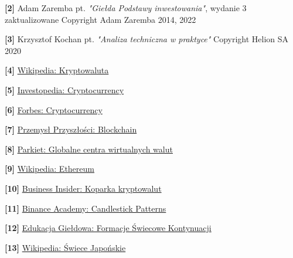 \documentclass[12pt,a4paper,twoside, inzynierska]{pwr_wmat_praca_dyplomowa}
\theoremstyle{plain}
\numberwithin{theorem}{chapter}
\theoremstyle{definition}
\numberwithin{theorem}{chapter}
\begin{document}
\noindent \textbf{[2]} Adam Zaremba pt. \textit{"Giełda Podstawy inwestowania"}, wydanie 3 zaktualizowane Copyright \textcopyright{} Adam Zaremba 2014, 2022 \newline

\noindent \textbf{[3]} Krzysztof Kochan pt. \textit{"Analiza techniczna w praktyce"} Copyright \textcopyright{} Helion SA 2020 \newline

\noindent \textbf{[4]} \href{https://pl.wikipedia.org/wiki/Kryptowaluta}{Wikipedia: Kryptowaluta} \newline

\noindent \textbf{[5]} \href{https://www.investopedia.com/terms/c/cryptocurrency.asp}{Investopedia: Cryptocurrency} \newline

\noindent \textbf{[6]} \href{https://www.forbes.com/advisor/investing/cryptocurrency/}{Forbes: Cryptocurrency} \newline

\noindent \textbf{[7]} \href{https://przemyslprzyszlosci.gov.pl/nawigator-technologiczny/blockchain/}{Przemysł Przyszłości: Blockchain} \newline

\noindent \textbf{[8]} \href{https://www.parkiet.com/kryptowaluty/art40380371-gdzie-sa-globalne-centra-wiary-w-wirtualne-waluty}{Parkiet: Globalne centra wirtualnych walut} \newline

\noindent \textbf{[9]} \href{https://pl.wikipedia.org/wiki/Ethereum}{Wikipedia: Ethereum} \newline

\noindent \textbf{[10]} \href{https://businessinsider.com.pl/kryptowaluty/koparka-kryptowalut}{Business Insider: Koparka kryptowalut} \newline

\noindent \textbf{[11]} \href{https://academy.binance.com/pl/articles/how-to-read-the-most-popular-crypto-candlestick-patterns}{Binance Academy: Candlestick Patterns} \newline

\noindent \textbf{[12]} \href{https://edukacjagieldowa.pl/gieldowe-abc/samouczki/formacje-swiecowe-kontynuacji}{Edukacja Giełdowa: Formacje Świecowe Kontynuacji} \newline

\noindent \textbf{[13]} \href{https://pl.wikipedia.org/wiki/%C5%9Awiece_japo%C5%84skie}{Wikipedia: Świece Japońskie} \newline
\end{document}
